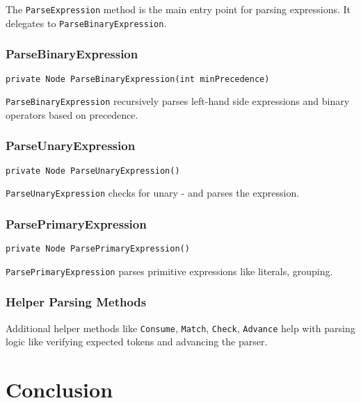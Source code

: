 \documentclass{article}
\begin{document}
The \texttt{ParseExpression} method is the main entry point for parsing expressions. It delegates to \texttt{ParseBinaryExpression}.


\subsubsection{ParseBinaryExpression}

\begin{lstlisting}[language={[Sharp]C}]
private Node ParseBinaryExpression(int minPrecedence)
\end{lstlisting}

\texttt{ParseBinaryExpression} recursively parses left-hand side expressions and binary operators based on precedence.


\subsubsection{ParseUnaryExpression}

\begin{lstlisting}[language={[Sharp]C}]
private Node ParseUnaryExpression()
\end{lstlisting}

\texttt{ParseUnaryExpression} checks for unary - and parses the expression.


\subsubsection{ParsePrimaryExpression}

\begin{lstlisting}[language={[Sharp]C}]
private Node ParsePrimaryExpression()
\end{lstlisting}

\texttt{ParsePrimaryExpression} parses primitive expressions like literals, grouping.

\subsubsection{Helper Parsing Methods}
Additional helper methods like \texttt{Consume}, \texttt{Match}, \texttt{Check}, \texttt{Advance} help with parsing logic like verifying expected tokens and advancing the parser.




\section{Conclusion}
\end{document}
